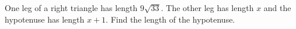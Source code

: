 One leg of a right triangle has length $9\sqrt{33}$. The other leg has length $x$ and the hypotenuse has length $x+1$. Find the length of the hypotenuse.
